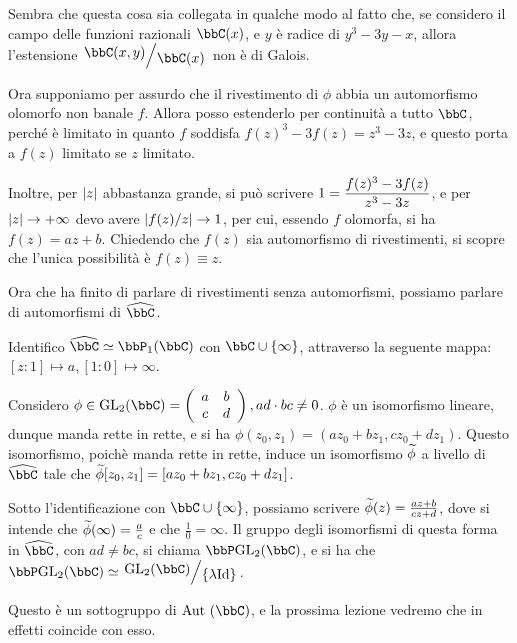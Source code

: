 Sembra che questa cosa sia collegata in qualche modo al fatto che, se considero il campo delle funzioni razionali $\bbC(x)$, e $y$ è radice di $y^3-3y-x$, allora l'estensione $\quotient{\bbC(x,y)}{\bbC(x)}$ non è di Galois.

Ora supponiamo per assurdo che il rivestimento di $\phi$ abbia un automorfismo olomorfo non banale $f$. Allora posso estenderlo per continuità a tutto $\bbC$, perché è limitato in quanto $f$ soddisfa $f(z)^3-3f(z)=z^3-3z$, e questo porta a $f(z)$ limitato se $z$ limitato.

Inoltre, per $\left| z \right|$ abbastanza grande, si può scrivere $\displaystyle 1=\frac{f(z)^3-3f(z)}{z^3-3z}$, e per $\left| z \right|\rightarrow+\infty$ devo avere $\left| f(z)/z \right|\rightarrow1$, per cui, essendo $f$ olomorfa, si ha $f(z)=az+b$. Chiedendo che $f(z)$ sia automorfismo di rivestimenti, si scopre che l'unica possibilità è $f(z)\equiv z$.

Ora che ha finito di parlare di rivestimenti senza automorfismi, possiamo parlare di automorfismi di $\oc \bbC$.

Identifico $\oc\bbC\isom\bbP_1(\bbC)$ con $\bbC\cup\{\infty\}$, attraverso la seguente mappa: $[z:1]\mapsto a, [1:0]\mapsto\infty$.

Considero $\phi\in\GL_2(\bbC)=\matrice abcd, ad\cdot bc \neq 0$. $\phi$ è un isomorfismo lineare, dunque manda rette in rette, e si ha $\phi(z_0,z_1)=(az_0+bz_1,cz_0+dz_1)$. Questo isomorfismo, poichè manda rette in rette, induce un isomorfismo $\widetilde{\phi}$ a livello di $\oc\bbC$ tale che $\widetilde{\phi}[z_0,z_1]=[az_0+bz_1,cz_0+dz_1]$.

Sotto l'identificazione con $\bbC\cup\{\infty\}$, possiamo scrivere $\widetilde{\phi}(z)=\frac{az+b}{cz+d}$, dove si intende che $\widetilde{\phi}(\infty)=\frac{a}{c}$ e che $\frac{1}{0}=\infty$. Il gruppo degli isomorfismi di questa forma in $\oc \bbC$, con $ad\neq bc$, si chiama $\bbP\GL_2(\bbC)$, e si ha che $\bbP\GL_2(\bbC)\isom\quotient{\GL_2(\bbC)}{\{\lambda\Id\}}$.

Questo è un sottogruppo di $\Aut(\bbC)$, e la prossima lezione vedremo che in effetti coincide con esso.

